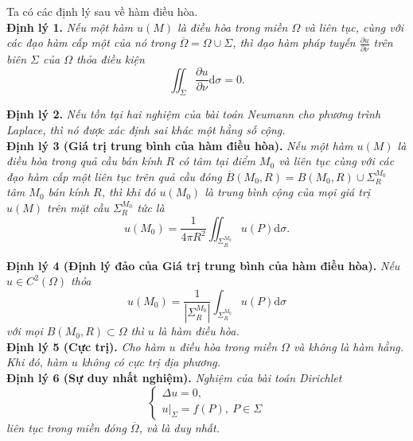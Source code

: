 \documentclass[10pt, a4paper]{article}
\begin{document}
	Ta có các định lý sau về hàm điều hòa.\\
	
	\textbf{Định lý 1.} \textit{Nếu một hàm $u(M)$ là điều hòa trong miền $\Omega$ và liên tục, cùng với các đạo hàm cấp một của nó trong $\overline\Omega=\Omega\cup\Sigma$, thì đạo hàm pháp tuyến $\frac{\partial u}{\partial\nu}$ trên biên $\Sigma$ của $\Omega$ thỏa điều kiện} $$\iint_\Sigma\frac{\partial u}{\partial\nu}\mathrm d\sigma=0.$$
	
	\textbf{Định lý 2.} \textit{Nếu tồn tại hai nghiệm của bài toán Neumann cho phương trình Laplace, thì nó được xác định sai khác một hằng số cộng.}\\
	
	\textbf{Định lý 3 (Giá trị trung bình của hàm điều hòa).} \textit{Nếu một hàm $u(M)$ là điều hòa trong quả cầu bán kính $R$ có tâm tại điểm $M_0$ và liên tục cùng với các đạo hàm cấp một liên tục trên quả cầu đóng $\overline B(M_0,R)=B(M_0,R)\cup\Sigma^{M_0}_R$ tâm $M_0$ bán kính $R$, thì khi đó $u(M_0)$ là trung bình cộng của mọi giá trị $u(M)$ trên mặt cầu $\Sigma^{M_0}_R$ tức là $$u(M_0)=\frac{1}{4\pi R^2}\iint_{\Sigma^{M_0}_R}u(P)\mathrm d\sigma.$$}
	
	\textbf{Định lý 4 (Định lý đảo của Giá trị trung bình của hàm điều hòa).} \textit{Nếu $u\in C^2(\Omega)$ thỏa} $$u(M_0)=\frac{1}{\left|\Sigma^{M_0}_R\right|}\int_{\Sigma^{M_0}_R}u(P)\mathrm d\sigma$$
	\textit{với mọi $B(M_0,R)\subset\Omega$ thì $u$ là hàm điều hòa.}\\
	
	\textbf{Định lý 5 (Cực trị).} \textit{Cho hàm $u$ điều hòa trong miền $\Omega$ và không là hàm hằng. Khi đó, hàm $u$ không có cực trị địa phương.}\\
	
	\textbf{Định lý 6 (Sự duy nhất nghiệm).} \textit{Nghiệm của bài toán Dirichlet} $$\begin{cases}
		\Delta u=0,\\
		u\big|_\Sigma=f(P),~P\in\Sigma
	\end{cases}$$
	\textit{liên tục trong miền đóng $\overline\Omega$, và là duy nhất.}
\end{document}

